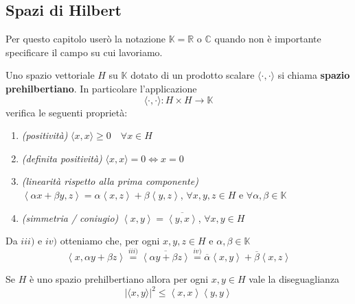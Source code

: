 \subsection{Spazi di Hilbert}
Per questo capitolo userò la notazione \(\mathbb{K} = \mathbb{R}\) o
\(\mathbb{C}\) quando non è importante specificare il campo su cui lavoriamo.
\begin{definition}
    Uno spazio vettoriale \(H\) su \(\mathbb{K}\) dotato di un
    prodotto scalare \(\langle \cdot, \cdot \rangle\) si chiama \textbf{spazio
    prehilbertiano}. In particolare l'applicazione
    \[
        \langle \cdot, \cdot \rangle : H \times H \to \mathbb{K}
    \]
    verifica le seguenti proprietà:
\begin{enumerate}[label = \roman*)]
    \item \emph{(positività)} \(\langle x, x \rangle \ge 0 \quad \forall x \in H\)
    \item \emph{(definita positività)} \(\langle x, x \rangle = 0 \iff x = 0\)
    \item \emph{(linearità rispetto alla prima componente)} \(\left< \alpha x + \beta y, z \right> = \alpha \left<
        x, z\right> + \beta \left<y, z \right>\), \(\forall x, y, z \in H\) e
        \(\forall \alpha, \beta \in \mathbb{K}\) 
    \item \emph{(simmetria / coniugio)} \(\left< x, y \right> = \overline{\left<
        y, x \right>}\), \(\forall x, y \in H\) 
\end{enumerate}
\end{definition}
\begin{remark}
    Da \(iii)\) e \(iv)\) otteniamo che, per ogni \(x, y, z \in H\) e \(\alpha,
    \beta \in \mathbb{K}\) 
    \[
        \left<x, \alpha y + \beta z \right> \overset{iii)}{=}
        \overline{\left<\alpha y + \beta z \right>} \overset{iv)}{=}
        \overline{\alpha} \left<x, y
        \right> + \overline{\beta} \left<x, z \right>
    \]
\end{remark}
\begin{theorem}\label{thm:schwarz}
    Se \(H\) è uno spazio prehilbertiano allora per ogni \(x, y \in H\) vale la
    diseguaglianza
    \[
        |\langle x, y \rangle|^{2} \le \left<x, x \right> \left<y, y \right>
    \]
\end{theorem}
